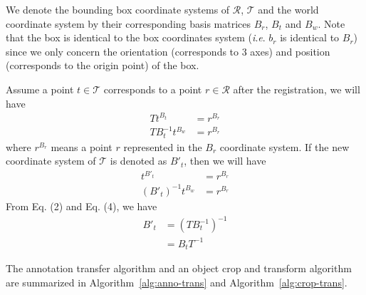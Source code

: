 \documentclass[letterpaper, 10 pt, conference]{ieeeconf}  %
\begin{document}
We denote the bounding box coordinate systems of $\mathcal{R}$, $\mathcal{T}$ and the world coordinate system by their corresponding basis matrices $B_r$, $B_t$ and $B_w$.  Note that the box is identical to the box coordinates system (\textit{i}.\textit{e}. $b_r$ is identical to $B_r$) since we only concern the orientation (corresponds to 3 axes) and position
(corresponds to the origin point) of the box.

Assume a point $t \in \mathcal{T}$ corresponds to a point $r \in \mathcal{R}$ after the registration, we will have
\begin{align}
T t^{B_t} &= r^{B_r}\\
T B_t^{-1}t^{B_w} &= r^{B_r} \label{eq:eq1}
\end{align}
where $r^{B_r}$ means a point $r$ represented in the $B_r$ coordinate system. If the new coordinate system of $\mathcal{T}$ is denoted as $B'_t$, then we will have
\begin{align} 
t^{B'_t} &= r^{B_r}\\
(B'_t)^{-1}t^{B_w} &= r^{B_r} \label{eq:eq2}
\end{align}
From Eq. (2) and Eq. (4), we have
\begin{align}
{B'_t} & = (T B_t^{-1})^{-1}\\
& = B_t T^{-1} \label{eq:eq5}
\end{align}

The annotation transfer algorithm and an object crop and transform algorithm are summarized in Algorithm~\ref{alg:anno-trans} and Algorithm~\ref{alg:crop-trans}.
\end{document}
